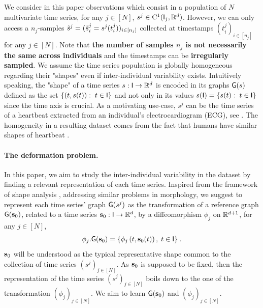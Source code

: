 We consider in this paper observations which consist in a population of $N$ multivariate time series, for any $j\in[N]$, $s^j \in \mathrm{C}^1(\mathsf{I}_j,\mathbb{R}^{d})$. However, we can only access a $n_j$-samples $\tilde{s}^j=(\tilde{s}_i^j=s^j(t^j_i))_{i\in[n_j]}$ collected at timestamps $(t^j_i)_{i\in[n_j]}$ for any $j \in [N]$. Note that \textbf{the number of samples $n_j$ is not necessarily the same across individuals} and the timestamps can be \textbf{irregularly sampled}. We assume the time series population is globally homogeneous regarding their "shapes" even if inter-individual variability exists. Intuitively speaking, the "shape" of a time series $s:\mathsf{I}\to \mathbb{R}^d$ is encoded in its graphs $\mathsf{G}(s)$ defined as the set $\{(t,s(t)):\; t\in\mathsf{I} \} $ and not only in its values $s(\mathsf{I})=\{s(t):\; t\in\mathsf{I} \} $ since the time axis is crucial. As a motivating use-case, $s^j$ can be the time series of a heartbeat extracted from an individual's electrocardiogram (ECG), see . The homogeneity in a resulting dataset comes from the fact that humans have similar shapes of heartbeat \cite{ye2012heartbeat,madona2021pqrst}.

\vspace{-1ex}
\paragraph*{The deformation problem.}
In this paper, we aim to study the inter-individual variability in the dataset by finding a relevant representation of each time series. Inspired from the framework of shape analysis \cite{vaillant2004statistics}, addressing similar problems in morphology, we suggest to represent each time series' graph $\mathsf{G}(s^j)$ as the transformation of a reference graph $\mathsf{G}(\mathbf{s}_0)$, related to a time series $\mathbf{s}_0:\mathsf{I} \to\mathbb{R}^d$, by a diffeomorphism $\phi_j$ on $\mathbb{R}^{d+1}$, for any $j\in[N]$,
\begin{equation}
 \label{eq:transformation}
 \phi_j.\mathsf{G}(\mathbf{s}_0)=\{\phi_j\left(t,\mathbf{s}_0(t)\right), \; t\in \mathsf{I} \} \;.
\end{equation}
$\mathbf{s}_0$ will be understood as the typical representative shape common to the collection of time series $(s^j)_{j\in[N]}$. As $\mathbf{s}_0$ is supposed to be fixed, then the representation of the time series $(s^j)_{j\in[N]}$ boils down to the one of the transformation $(\phi_j)_{j\in[N]}$. We aim to learn $\mathsf{G}(\mathbf{s}_0)$ and $(\phi_j)_{j\in[N]} $. 

\vspace{-1ex}
